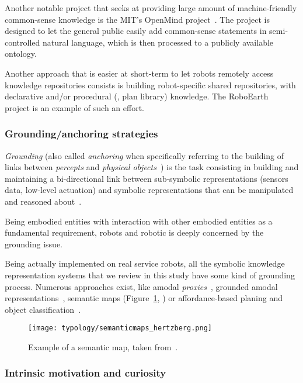 Another notable project that seeks at providing large amount of
machine-friendly common-sense knowledge is the MIT's OpenMind
project~\cite{Singh2002}. The project is designed to let the general public
easily add common-sense statements in semi-controlled natural language, which is
then processed to a publicly available ontology.

Another approach that is easier at short-term to let robots remotely access
knowledge repositories consists is building robot-specific shared repositories,
with declarative and/or procedural (\ie, plan library) knowledge. The
RoboEarth~\cite{Waibel2011} project is an example of such an effort.

\subsubsection{Grounding/anchoring strategies}
\label{sect|grounding}

\emph{Grounding} (also called \emph{anchoring} when specifically referring to the
building of links between \emph{percepts} and \emph{physical
objects}~\cite{Coradeschi2003}) is the task consisting in building and
maintaining a bi-directional link between sub-symbolic representations (sensors
data, low-level actuation) and symbolic representations that can be
manipulated and reasoned about~\cite{Harnad1990}.

Being embodied entities with interaction with other embodied entities as a
fundamental requirement, robots and robotic is deeply concerned by the
grounding issue.

Being actually implemented on real service robots, all the symbolic knowledge
representation systems that we review in this study have some kind of grounding
process. Numerous approaches exist, like amodal
\emph{proxies}~\cite{Jacobsson2008}, grounded amodal
representations~\cite{Alami2011, Mavridis2006}, semantic maps
(Figure~\ref{fig|semanticmap}, \cite{Nuechter2008, Galindo2008,Blodow2011}) or
affordance-based planing and object classification~\cite{Lorken2008,
Varadarajan2011}.


\begin{figure}
    \centering
    \texttt{[image: typology/semanticmaps\_hertzberg.png]}
    \caption{Example of a semantic map, taken from~\cite{Nuechter2008}.}
    \label{fig|semanticmap}
\end{figure}

\subsubsection{Intrinsic motivation and curiosity}

